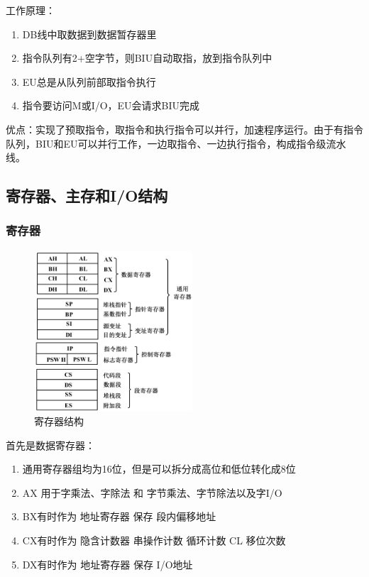 \documentclass{article}
\begin{document}
工作原理：

\begin{enumerate}
    \item DB线中取数据到数据暂存器里
    \item 指令队列有2+空字节，则BIU自动取指，放到指令队列中
    \item EU总是从队列前部取指令执行
    \item 指令要访问M或I/O，EU会请求BIU完成
\end{enumerate}

优点：实现了预取指令，取指令和执行指令可以并行，加速程序运行。由于有指令队列，BIU和EU可以并行工作，一边取指令、一边执行指令，构成指令级流水线。

\subsection{寄存器、主存和I/O结构}


\subsubsection{寄存器}

\begin{figure}[H]
    \centering
    \includegraphics[height=6cm]{img/2.1-2.png}
    \caption{寄存器结构}
\end{figure}

首先是数据寄存器：
\begin{enumerate}
    \item 通用寄存器组均为16位，但是可以拆分成高位和低位转化成8位
    \item AX 用于字乘法、字除法 和 字节乘法、字节除法以及字I/O
    \item BX有时作为 地址寄存器 保存 段内偏移地址 
    \item CX有时作为 隐含计数器 串操作计数 循环计数 CL 移位次数
    \item DX有时作为 地址寄存器 保存 I/O地址
\end{enumerate}
\end{document}
